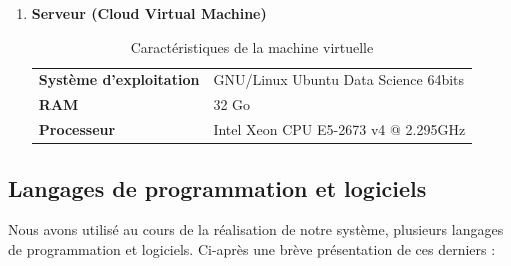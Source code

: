 \begin{enumerate}
        \item{\textbf{Serveur (Cloud Virtual Machine)}}
        \begin{table}[h!]
            \begin{center}
                \begin{tabular}{|C{5cm}|C{8cm}|}
                    \hline
                    \textbf{Système d'exploitation} &  GNU/Linux Ubuntu Data Science 64bits \\
                    \textbf{RAM} &  32 Go \\
                    \textbf{Processeur} & Intel Xeon CPU E5-2673 v4 @ 2.295GHz \\
                    \hline
                \end{tabular}
            \end{center}
        \caption{Caractéristiques de la machine virtuelle}
        \end{table}
    \end{enumerate}   

    \subsection{Langages de programmation et logiciels}
    Nous avons utilisé au cours de la réalisation de notre système, plusieurs langages de programmation et logiciels. Ci-après une brève présentation de ces derniers :
